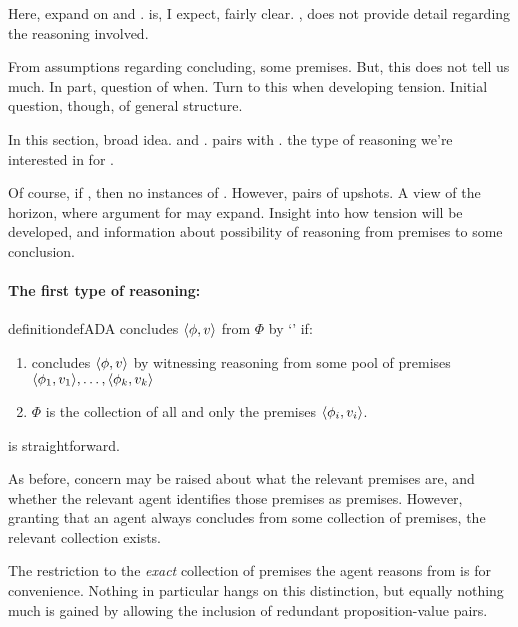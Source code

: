 \begin{note}
  Here, expand on \ESU{} and \EAS{}.
  \ESU{} is, I expect, fairly clear.
  \EAS{}, does not provide detail regarding the reasoning involved.

  From assumptions regarding concluding, some premises.
  But, this does not tell us much.
  In part, question of when.
  Turn to this when developing tension.
  Initial question, though, of general structure.

  In this section, broad idea.
  \adA{} and \adB{}.
  \adA{} pairs with \USE{}.
  \adB{} the type of reasoning we're interested in for \EAS{}.

  Of course, if \ESU{}, then no instances of \adB{}.
  However, pairs of upshots.
  A view of the horizon, where argument for \EAS{} may expand.
  Insight into how tension will be developed, \csN{} and information about possibility of reasoning from premises to some conclusion.
\end{note}

\paragraph*{The first type of reasoning: \adA{}}

\begin{note}
  \begin{restatable}[\adA{}]{definition}{defADA}
    \label{AR:adA}
    \label{def:adA}
    \vAgent{} concludes \(\langle \phi, v \rangle\) from \(\Phi\) by `\adA{}' if:
    \begin{enumerate}[label=\textsf{S:\arabic*}., ref=(\textsf{S}:\arabic*)]
    \item
      \label{def:adA:psi}
      \vAgent{} concludes \(\langle \phi, v \rangle\) by witnessing reasoning from some pool of premises \(\langle \phi_{1}, v_{1} \rangle,\dots,\langle \phi_{k}, v_{k} \rangle\)
    \item
      \(\Phi\) is the collection of all and only the premises \(\langle \phi_{i}, v_{i} \rangle\).
    \end{enumerate}
    \vspace{-\baselineskip}
  \end{restatable}

  \adA{} is straightforward.

  As before, concern may be raised about what the relevant premises are, and whether the relevant agent identifies those premises as premises.
  However, granting that an agent always concludes from some collection of premises, the relevant collection exists.

  The restriction to the \emph{exact} collection of premises the agent reasons from is for convenience.
  Nothing in particular hangs on this distinction, but equally nothing much is gained by allowing the inclusion of redundant proposition-value pairs.
\end{note}

